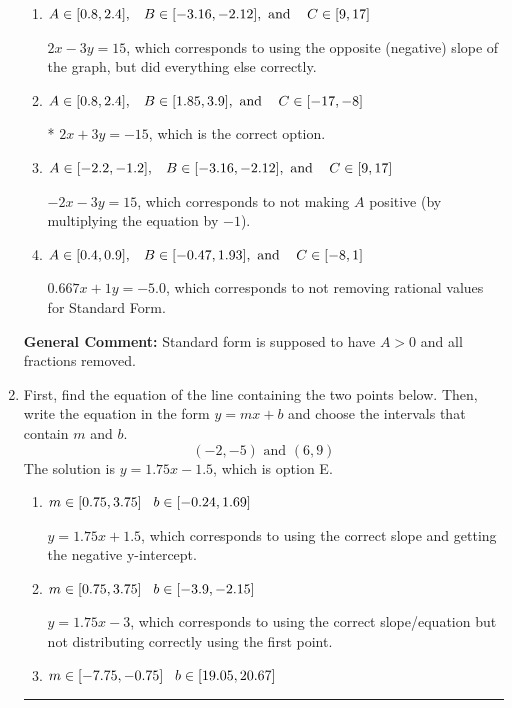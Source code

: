 \documentclass{extbook}[14pt]
\newcommand{\litem}[1]{\item #1

\rule{\textwidth}{0.4pt}}
\begin{document}
\begin{enumerate}
{\begin{enumerate}[label=\Alph*.]
 $0.667x - 1y = 5.0$, which corresponds to using the opposite (negative) slope of the graph and not removing rational values.
\item \( A \in [0.8, 2.4], \hspace{3mm} B \in [-3.16, -2.12], \text{ and } \hspace{3mm} C \in [9, 17] \)

 $2x - 3y = 15$, which corresponds to using the opposite (negative) slope of the graph, but did everything else correctly.
\item \( A \in [0.8, 2.4], \hspace{3mm} B \in [1.85, 3.9], \text{ and } \hspace{3mm} C \in [-17, -8] \)

* $2x + 3y = -15$, which is the correct option.
\item \( A \in [-2.2, -1.2], \hspace{3mm} B \in [-3.16, -2.12], \text{ and } \hspace{3mm} C \in [9, 17] \)

 $-2x - 3y = 15$, which corresponds to not making $A$ positive (by multiplying the equation by $-1$).
\item \( A \in [0.4, 0.9], \hspace{3mm} B \in [-0.47, 1.93], \text{ and } \hspace{3mm} C \in [-8, 1] \)

 $0.667x + 1y = -5.0$, which corresponds to not removing rational values for Standard Form.
\end{enumerate}

\textbf{General Comment:} Standard form is supposed to have $A > 0$ and all fractions removed.
}
\litem{
First, find the equation of the line containing the two points below. Then, write the equation in the form $ y=mx+b $ and choose the intervals that contain $m$ and $b$.
\[ (-2, -5) \text{ and } (6, 9) \]The solution is \( y = 1.75x -1.5 \), which is option E.\begin{enumerate}[label=\Alph*.]
\item \( m \in [0.75, 3.75] \hspace*{3mm} b \in [-0.24, 1.69] \)

 $y = 1.75x + 1.5$, which corresponds to using the correct slope and getting the negative y-intercept.
\item \( m \in [0.75, 3.75] \hspace*{3mm} b \in [-3.9, -2.15] \)

 $y = 1.75x -3$, which corresponds to using the correct slope/equation but not distributing correctly using the first point.
\item \( m \in [-7.75, -0.75] \hspace*{3mm} b \in [19.05, 20.67] \)


\end{enumerate}}
\end{enumerate}
\end{document}
